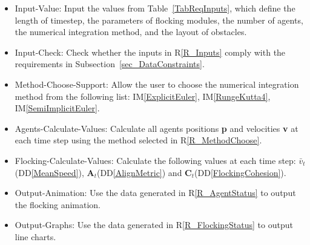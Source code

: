 \documentclass[12pt]{article}
\newcommand{\ddref}[1]{DD\ref{#1}}
\newcommand{\iref}[1]{IM\ref{#1}}
\newcounter{reqnum} %
\newcommand{\rref}[1]{R\ref{#1}}
\begin{document}
\noindent \begin{itemize}

\item[R\refstepcounter{reqnum}\thereqnum \label{R_Inputs}:] 
Input-Value: Input the values from Table~\ref{TabReqInputs}, which define the length of 
timestep, the parameters of flocking modules, the number of agents, the 
numerical integration method, and the layout of obstacles.

\item[R\refstepcounter{reqnum}\thereqnum \label{R_OutputInputs}:]
Input-Check: Check whether the inputs in \rref{R_Inputs} comply with the requirements in 
Subsection~\ref{sec_DataConstraints}.

\item[R\refstepcounter{reqnum}\thereqnum \label{R_MethodChoose}:]
Method-Choose-Support: Allow the user to choose the numerical integration method from the following 
list: \iref{ExplicitEuler}, \iref{RungeKutta4}, \iref{SemiImplicitEuler}.

\item[R\refstepcounter{reqnum}\thereqnum \label{R_AgentStatus}:]
Agents-Calculate-Values: Calculate all agents positions \textbf{p} and velocities \textbf{v} at each time 
step using the method selected in \rref{R_MethodChoose}.

\item[R\refstepcounter{reqnum}\thereqnum \label{R_FlockingStatus}:]
Flocking-Calculate-Values: Calculate the following values at each time step: $\bar{v}_t$(\ddref{MeanSpeed}), 
$\mathbf{A}_t$(\ddref{AlignMetric}) and $\mathbf{C}_t$(\ddref{FlockingCohesion}).

\item[R\refstepcounter{reqnum}\thereqnum \label{R_AniamtionOutput}:]
Output-Animation: Use the data generated in \rref{R_AgentStatus} to output the flocking animation.

\item[R\refstepcounter{reqnum}\thereqnum \label{R_GraphOutput}:]
Output-Graphs: Use the data generated in \rref{R_FlockingStatus} to output line charts.

\end{itemize}
\end{document}
